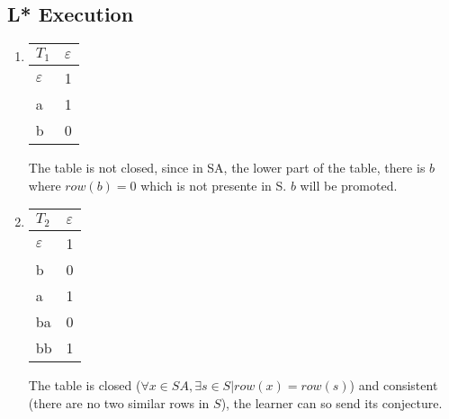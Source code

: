 \subsection{L* Execution}
\begin{enumerate}
  \item \begin{minipage}{0.3\textwidth}
          \begin{tabular}{l||l}
            $T_1$         & $\varepsilon$ \\
            \hline\hline
            $\varepsilon$ & 1             \\
            \hline\hline
            a             & 1             \\
            b             & 0             \\
          \end{tabular}
        \end{minipage} \quad
        \begin{minipage}{0.6\textwidth}
          The table is not closed, since in SA, the lower part of the table, there is $b$ where $row(b) = 0$ which is not presente in S. $b$ will be promoted.
        \end{minipage}
  \item \begin{minipage}{0.3\textwidth}
          \begin{tabular}{l||l}
            $T_2$         & $\varepsilon$ \\
            \hline\hline
            $\varepsilon$ & 1             \\
            b             & 0             \\
            \hline\hline
            a             & 1             \\
            ba            & 0             \\
            bb            & 1             \\
          \end{tabular}
        \end{minipage}\quad
        \begin{minipage}{0.6\textwidth}
          The table is closed ($\forall x \in SA, \exists s \in S | row(x) = row(s)$) and consistent (there are no two similar rows in $S$), the learner can so send its conjecture.
        \end{minipage}


\end{enumerate}

